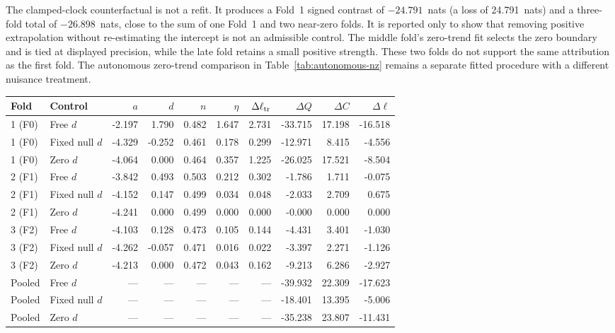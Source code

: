 The clamped-clock counterfactual is not a refit. It produces a Fold~1 signed contrast of $-24.791$~nats (a loss of 24.791~nats) and a three-fold total of $-26.898$~nats, close to the sum of one Fold~1 and two near-zero folds. It is reported only to show that removing positive extrapolation without re-estimating the intercept is not an admissible control. The middle fold's zero-trend fit selects the zero boundary and is tied at displayed precision, while the late fold retains a small positive strength. These two folds do not support the same attribution as the first fold. The autonomous zero-trend comparison in Table~\ref{tab:autonomous-nz} remains a separate fitted procedure with a different nuisance treatment.

\begin{table}[htbp]\centering\scriptsize
\setlength{\tabcolsep}{2.6pt}
\begin{tabular}{@{}llrrrrrrrr@{}}\toprule
Fold & Control & $a$ & $d$ & $n$ & $\eta$ & $\Delta\ell_{\rm tr}$ & $\Delta Q$ & $\Delta C$ & $\Delta\ell$\\\midrule
1 (F0) & Free $d$ & -2.197 & 1.790 & 0.482 & 1.647 & 2.731 & -33.715 & 17.198 & -16.518 \\
1 (F0) & Fixed null $d$ & -4.329 & -0.252 & 0.461 & 0.178 & 0.299 & -12.971 & 8.415 & -4.556 \\
1 (F0) & Zero $d$ & -4.064 & 0.000 & 0.464 & 0.357 & 1.225 & -26.025 & 17.521 & -8.504 \\
2 (F1) & Free $d$ & -3.842 & 0.493 & 0.503 & 0.212 & 0.302 & -1.786 & 1.711 & -0.075 \\
2 (F1) & Fixed null $d$ & -4.152 & 0.147 & 0.499 & 0.034 & 0.048 & -2.033 & 2.709 & 0.675 \\
2 (F1) & Zero $d$ & -4.241 & 0.000 & 0.499 & 0.000 & 0.000 & -0.000 & 0.000 & 0.000 \\
3 (F2) & Free $d$ & -4.103 & 0.128 & 0.473 & 0.105 & 0.144 & -4.431 & 3.401 & -1.030 \\
3 (F2) & Fixed null $d$ & -4.262 & -0.057 & 0.471 & 0.016 & 0.022 & -3.397 & 2.271 & -1.126 \\
3 (F2) & Zero $d$ & -4.213 & 0.000 & 0.472 & 0.043 & 0.162 & -9.213 & 6.286 & -2.927 \\
\addlinespace
Pooled & Free $d$ & --- & --- & --- & --- & --- & -39.932 & 22.309 & -17.623 \\
Pooled & Fixed null $d$ & --- & --- & --- & --- & --- & -18.401 & 13.395 & -5.006 \\
Pooled & Zero $d$ & --- & --- & --- & --- & --- & -35.238 & 23.807 & -11.431 \\

\end{tabular}
\end{table}
